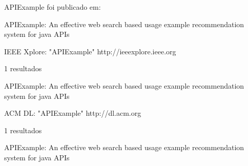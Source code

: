 APIExample foi publicado em:

APIExample: An effective web search based usage example recommendation system for java APIs

IEEE Xplore: "APIExample"
http://ieeexplore.ieee.org

1 resultados

APIExample: An effective web search based usage example recommendation system for java APIs

ACM DL: "APIExample"
http://dl.acm.org

1 resultados

APIExample: An effective web search based usage example recommendation system for java APIs 
